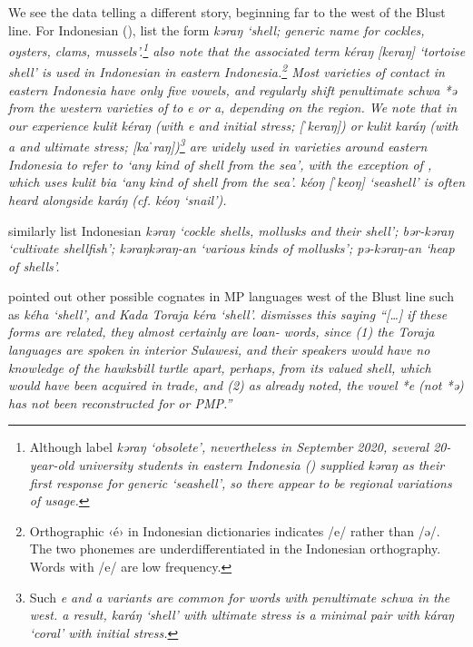 We see the data telling a different story,
beginning far to the west of the Blust line.
For Indonesian (), 
\citet{StevensSchmidgall-Tellings2010} list the form \it{kəraŋ}
‘shell; generic name for cockles,
oysters, clams, mussels’.\footnote{
		Although \citet{StevensSchmidgall-Tellings2010} label \it{kəraŋ} ‘obsolete’,
		nevertheless in September 2020,
		several 20-year-old university students in eastern Indonesia
		() supplied \it{kəraŋ} as their first response for generic
		‘seashell’, so there appear to be regional variations of usage.}
\citet{StevensSchmidgall-Tellings2010} also note that the associated
term \it{kéraŋ} [keraŋ] ‘tortoise shell’ is used in Indonesian
in eastern Indonesia.\footnote{
		Orthographic ‹é› in Indonesian
		dictionaries indicates /e/ rather than /ə/.
		The two phonemes are underdifferentiated in the Indonesian orthography.
		Words with /e/ are low frequency.}
Most varieties of contact 
in eastern Indonesia have only five vowels,
and regularly shift penultimate schwa *ə from the western varieties
of  to \it{e} or \it{a},
depending on the region.
We note that in our experience \it{kulit kéraŋ} (with \it{e}
and initial stress; [ˈkeraŋ]) or \it{kulit karáŋ} (with \it{a}
and ultimate stress; [kaˈraŋ])\footnote{
		Such \it{e}
		and \it{a} variants are common for  words with penultimate
		schwa in the west.
		 a result, \it{karáŋ} ‘shell’ with ultimate stress is a minimal
		pair with \it{káraŋ} ‘coral’ with initial stress.}
are widely
used in  varieties around eastern Indonesia to refer to
‘any kind of shell from the sea’,
with the exception of  ,
which uses \it{kulit bia} ‘any kind of shell from the sea’.
  \it{kéoŋ} [ˈkeoŋ] ‘seashell’ is often heard alongside
\it{karáŋ} (cf.  \it{kéoŋ} ‘snail’).

\citet{EcholsWolff1989} similarly list Indonesian \it{kəraŋ}
‘cockle shells, mollusks and their shell’; \it{bər-kəraŋ} ‘cultivate shellfish’;
\it{kəraŋ{\tl}kəraŋ-an} ‘various kinds of mollusks’; \it{pə-kəraŋ-an} ‘heap of shells’.

\citet{Nothofer1992} pointed out other possible cognates in MP
languages west of the Blust line such as  \it{kéha} ‘shell’,
and Kada Toraja \it{kéra} ‘shell’.
\citet[46]{Blust2009} dismisses this saying
“[\ldots] if these forms are related, they almost certainly are loan-
words, since (1) the Toraja languages are spoken in interior Sulawesi, and their speakers
would have no knowledge of the hawksbill turtle apart, perhaps, from its valued shell,
which would have been acquired in trade, and (2) as already noted, the vowel *e (not *ə)
has not been reconstructed for  or PMP.”
 


